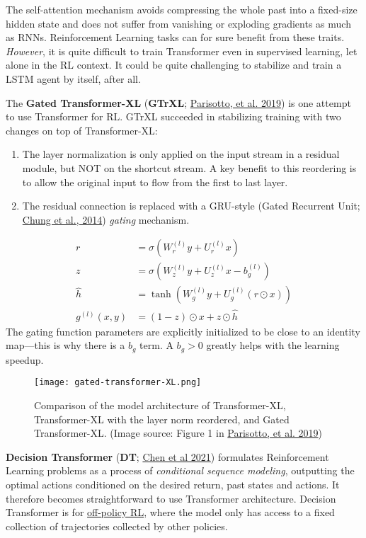 \documentclass[12pt]{article}
\begin{document}
The self-attention mechanism avoids compressing the whole past into a fixed-size hidden state and does not suffer from vanishing or exploding gradients as much as RNNs. Reinforcement Learning tasks can for sure benefit from these traits. \emph{However}, it is quite difficult to train Transformer even in supervised learning, let alone in the RL context. It could be quite challenging to stabilize and train a LSTM agent by itself, after all.

The \textbf{Gated Transformer-XL} (\textbf{GTrXL}; \href{https://arxiv.org/abs/1910.06764}{Parisotto, et al. 2019}) is one attempt to use Transformer for RL. GTrXL succeeded in stabilizing training with two changes on top of Transformer-XL:
\begin{enumerate}
    \item The layer normalization is only applied on the input stream in a residual module, but NOT on the shortcut stream. A key benefit to this reordering is to allow the original input to flow from the first to last layer.
    \item The residual connection is replaced with a GRU-style (Gated Recurrent Unit; \href{https://arxiv.org/abs/1412.3555}{Chung et al., 2014}) \emph{gating} mechanism.
\end{enumerate}
\[
\begin{aligned}
r &= \sigma(W_r^{(l)} y + U_r^{(l)} x) \\
z &= \sigma(W_z^{(l)} y + U_z^{(l)} x - b_g^{(l)}) \\
\hat{h} &= \tanh(W_g^{(l)} y + U_g^{(l)} (r \odot x)) \\
g^{(l)}(x, y) &= (1-z)\odot x + z\odot \hat{h}
\end{aligned}
\]
The gating function parameters are explicitly initialized to be close to an identity map---this is why there is a $b_g$ term. A $b_g > 0$ greatly helps with the learning speedup.

\begin{figure}[h!]
    \centering
    \texttt{[image: gated-transformer-XL.png]}
    \caption{Comparison of the model architecture of Transformer-XL, Transformer-XL with the layer norm reordered, and Gated Transformer-XL. (Image source: Figure 1 in \href{https://arxiv.org/abs/1910.06764}{Parisotto, et al. 2019})}
\end{figure}

\textbf{Decision Transformer} (\textbf{DT}; \href{https://arxiv.org/abs/2106.01345}{Chen et al 2021}) formulates Reinforcement Learning problems as a process of \emph{conditional sequence modeling}, outputting the optimal actions conditioned on the desired return, past states and actions. It therefore becomes straightforward to use Transformer architecture. Decision Transformer is for \href{https://lilianweng.github.io/posts/2018-02-19-rl-overview/#key-concepts}{off-policy RL}, where the model only has access to a fixed collection of trajectories collected by other policies.
\end{document}
